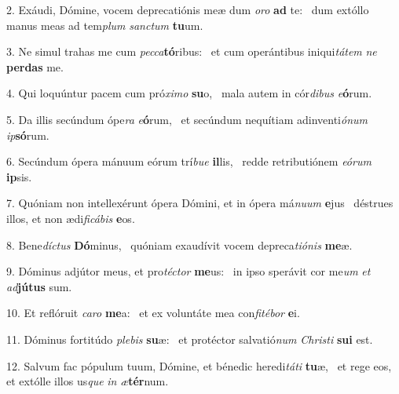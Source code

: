 2. Exáudi, Dómine, vocem deprecatiónis meæ dum \textit{o}\textit{ro} \textbf{ad} te: \ast\  dum extóllo manus meas ad tem\textit{plum} \textit{sanc}\textit{tum} \textbf{tu}um.\

3. Ne simul trahas me cum \textit{pec}\textit{ca}\textbf{tó}ribus: \ast\  et cum operántibus iniqui\textit{tá}\textit{tem} \textit{ne} \textbf{per}\textbf{das} me.\

4. Qui loquúntur pacem cum pró\textit{xi}\textit{mo} \textbf{su}o, \ast\  mala autem in cór\textit{di}\textit{bus} \textit{e}\textbf{ó}rum.\

5. Da illis secúndum ópe\textit{ra} \textit{e}\textbf{ó}rum, \ast\  et secúndum nequítiam adinventi\textit{ó}\textit{num} \textit{ip}\textbf{só}rum.\

6. Secúndum ópera mánuum eórum trí\textit{bu}\textit{e} \textbf{il}lis, \ast\  redde retributiónem \textit{e}\textit{ó}\textit{rum} \textbf{ip}sis.\

7. Quóniam non intellexérunt ópera Dómini, et in ópera má\textit{nu}\textit{um} \textbf{e}jus \ast\  déstrues illos, et non ædi\textit{fi}\textit{cá}\textit{bis} \textbf{e}os.\

8. Bene\textit{díc}\textit{tus} \textbf{Dó}minus, \ast\  quóniam exaudívit vocem depreca\textit{ti}\textit{ó}\textit{nis} \textbf{me}æ.\

9. Dóminus adjútor meus, et pro\textit{téc}\textit{tor} \textbf{me}us: \ast\  in ipso sperávit cor me\textit{um} \textit{et} \textit{ad}\textbf{jú}\textbf{tus} sum.\

10. Et reflóruit \textit{ca}\textit{ro} \textbf{me}a: \ast\  et ex voluntáte mea con\textit{fi}\textit{té}\textit{bor} \textbf{e}i.\

11. Dóminus fortitúdo \textit{ple}\textit{bis} \textbf{su}æ: \ast\  et protéctor salvatió\textit{num} \textit{Chris}\textit{ti} \textbf{su}\textbf{i} est.\

12. Salvum fac pópulum tuum, Dómine, et bénedic heredi\textit{tá}\textit{ti} \textbf{tu}æ, \ast\  et rege eos, et extólle illos us\textit{que} \textit{in} \textit{æ}\textbf{tér}num.\

